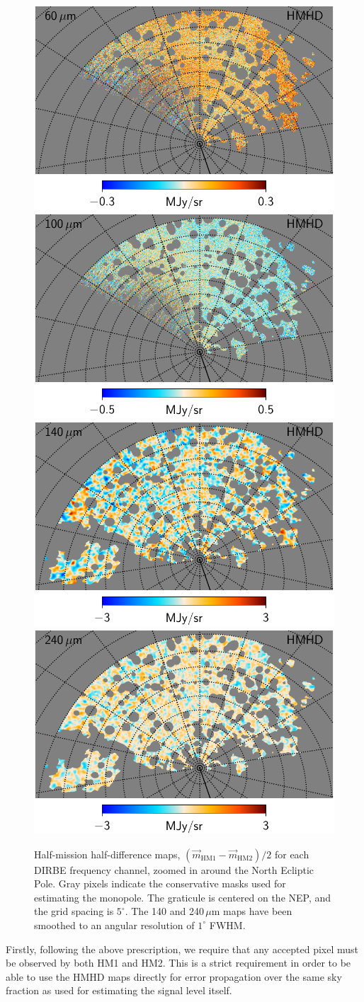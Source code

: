 \documentclass{aa}
\newcommand{\m}[0]{\vec{m}}
\begin{document}
\begin{figure}
  \includegraphics[width=0.376\linewidth]{figs/CGDR2_07_hmhd_fullres.pdf}\hspace*{5mm}
  \includegraphics[width=0.376\linewidth]{figs/CGDR2_08_hmhd_fullres.pdf}\\
  \includegraphics[width=0.376\linewidth]{figs/CGDR2_09_hmhd_fullres_1deg.pdf}\hspace*{5mm}
  \includegraphics[width=0.376\linewidth]{figs/CGDR2_10_hmhd_fullres_1deg.pdf}
  \caption{Half-mission half-difference maps, $(\m_{\mathrm{HM1}}-\m_{\mathrm{HM2}})/2$ for each DIRBE frequency channel, zoomed in around the North Ecliptic Pole. Gray pixels indicate the conservative masks used for estimating the monopole. The graticule is centered on the NEP, and the grid spacing is $5^{\circ}$. The 140 and 240\,$\mu\mathrm{m}$ maps have been smoothed to an angular resolution of $1^{\circ}$ FWHM.}
  \label{fig:hmhd_zoom}
\end{figure}

Firstly, following the above prescription, we require that any
accepted pixel must be observed by both HM1 and HM2. This is a strict
requirement in order to be able to use the HMHD maps directly for
error propagation over the same sky fraction as used for estimating
the signal level itself. 
\end{document}
